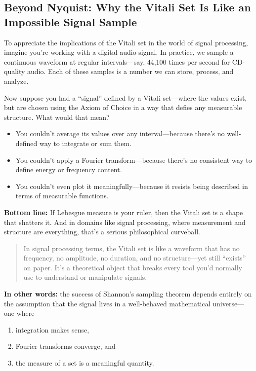 \subsection{Beyond Nyquist: Why the Vitali Set Is Like an Impossible Signal Sample}

To appreciate the implications of the Vitali set in the world of signal processing, imagine you're working with a digital audio signal. In practice, we sample a continuous waveform at regular intervals—say, 44,100 times per second for CD-quality audio. Each of these samples is a number we can store, process, and analyze.

Now suppose you had a “signal” defined by a Vitali set—where the values exist, but are chosen using the Axiom of Choice in a way that defies any measurable structure. What would that mean?

\begin{itemize}
  \item You couldn’t average its values over any interval—because there's no well-defined way to integrate or sum them.
  \item You couldn’t apply a Fourier transform—because there’s no consistent way to define energy or frequency content.
  \item You couldn’t even plot it meaningfully—because it resists being described in terms of measurable functions.
\end{itemize}

\textbf{Bottom line:} If Lebesgue measure is your ruler, then the Vitali set is a shape that shatters it. And in domains like signal processing, where measurement and structure are everything, that’s a serious philosophical curveball.


\begin{quote}
In signal processing terms, the Vitali set is like a waveform that has no frequency, no amplitude, no duration, and no structure—yet still “exists” on paper. It’s a theoretical object that breaks every tool you’d normally use to understand or manipulate signals.
\end{quote}


\textbf{In other words:} the success of Shannon's sampling theorem depends entirely on the assumption that the signal lives in a well-behaved mathematical universe—one where 

\begin{enumerate}
	\item integration makes sense, 
	\item Fourier transforms converge, and 
	\item the measure of a set is a meaningful quantity. 
\end{enumerate}

